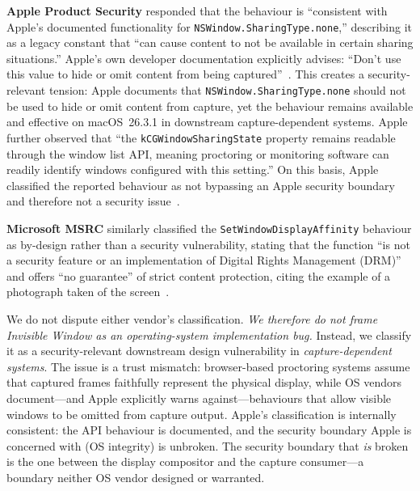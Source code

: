 \documentclass[conference]{IEEEtran}
\begin{document}
\textbf{Apple Product Security} responded that the behaviour is ``consistent with Apple's documented functionality for \texttt{NSWindow\allowbreak{}.SharingType.none},'' describing it as a legacy constant that ``can cause content to not be available in certain sharing situations.'' Apple's own developer documentation explicitly advises: ``Don't use this value to hide or omit content from being captured''~\cite{apple2025sharingtype}. This creates a security-relevant tension: Apple documents that \texttt{NSWindow.SharingType.none} should not be used to hide or omit content from capture, yet the behaviour remains available and effective on macOS~26.3.1 in downstream capture-dependent systems. Apple further observed that ``the \texttt{kCGWindowSharingState} property remains readable through the window list API, meaning proctoring or monitoring software can readily identify windows configured with this setting.'' On this basis, Apple classified the reported behaviour as not bypassing an Apple security boundary and therefore not a security issue~\cite{apple2026response}.

\textbf{Microsoft MSRC} similarly classified the \texttt{SetWindowDisplayAffinity} behaviour as by-design rather than a security vulnerability, stating that the function ``is not a security feature or an implementation of Digital Rights Management (DRM)'' and offers ``no guarantee'' of strict content protection, citing the example of a photograph taken of the screen~\cite{msrc2026response,microsoft2025setwindow}.

We do not dispute either vendor's classification. \textit{We therefore do not frame Invisible Window as an operating-system implementation bug.} Instead, we classify it as a security-relevant downstream design vulnerability in \emph{capture-dependent systems}. The issue is a trust mismatch: browser-based proctoring systems assume that captured frames faithfully represent the physical display, while OS vendors document---and Apple explicitly warns against---behaviours that allow visible windows to be omitted from capture output. Apple's classification is internally consistent: the API behaviour is documented, and the security boundary Apple is concerned with (OS integrity) is unbroken. The security boundary that \textit{is} broken is the one between the display compositor and the capture consumer---a boundary neither OS vendor designed or warranted.
\end{document}
